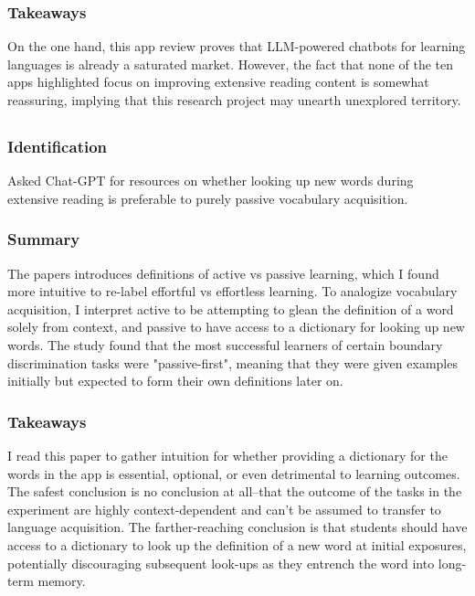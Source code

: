 \documentclass[
	letterpaper, %
]{jdf}
\begin{document}
\subsubsection{Takeaways}
On the one hand, this app review proves that LLM-powered chatbots for learning languages is already a saturated market. However, the fact that none of the ten apps highlighted focus on improving extensive reading content is somewhat reassuring, implying that this research project may unearth unexplored territory.

\subsection{}
\subsubsection{Identification}
Asked Chat-GPT for resources on whether looking up new words during extensive reading is preferable to purely passive vocabulary acquisition.

\subsubsection{Summary}
The papers introduces definitions of active vs passive learning, which I found more intuitive to re-label effortful vs effortless learning. To analogize vocabulary acquisition, I interpret active to be attempting to glean the definition of a word solely from context, and passive to have access to a dictionary for looking up new words. The study found that the most successful learners of certain boundary discrimination tasks were "passive-first", meaning that they were given examples initially but expected to form their own definitions later on.

\subsubsection{Takeaways}
I read this paper to gather intuition for whether providing a dictionary for the words in the app is essential, optional, or even detrimental to learning outcomes. The safest conclusion is no conclusion at all–that the outcome of the tasks in the experiment are highly context-dependent and can't be assumed to transfer to language acquisition. The farther-reaching conclusion is that students should have access to a dictionary to look up the definition of a new word at initial exposures, potentially discouraging subsequent look-ups as they entrench the word into long-term memory.
\end{document}

